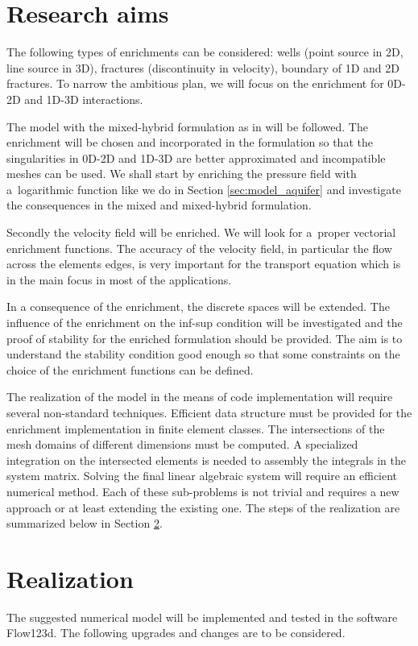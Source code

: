 \documentclass[dvipsnames,FM,Dis]{tulthesis}
\begin{document}
\section{Research aims}

The following types of enrichments can be considered: wells (point source in 2D, line source in 3D), 
fractures (discontinuity in velocity), boundary of 1D and 2D fractures. 
To narrow the ambitious plan, we will focus on the enrichment for 0D-2D and 1D-3D interactions.

The model with the mixed-hybrid formulation as in \cite{brezina_mixed-hybrid_2010, sistek_bddc_2015} will be followed.
The enrichment will be chosen and incorporated in the formulation so that the singularities in 0D-2D and
1D-3D are better approximated and incompatible meshes can be used. 
We shall start by enriching the pressure field with a~logarithmic function like we
do in Section \ref{sec:model_aquifer} and investigate the consequences in the mixed and mixed-hybrid formulation.

Secondly the velocity field will be enriched. We will look for a~proper vectorial enrichment functions.
The accuracy of the velocity field, in particular the flow across the elements edges, is very important for
the transport equation which is in the main focus in most of the applications.

In a consequence of the enrichment, the discrete spaces will be extended. The influence of the enrichment on the inf-sup 
condition will be investigated and the proof of stability for the enriched formulation should be provided.
The aim is to understand the stability condition good enough so that some constraints on the choice of the enrichment 
functions can be defined. 

The realization of the model in the means of code implementation will require several non-standard techniques.
Efficient data structure must be provided for the enrichment implementation in finite element classes.
The intersections of the mesh domains of different dimensions must be computed. A specialized integration
on the intersected elements is needed to assembly the integrals in the system matrix. 
Solving the final linear algebraic system will require an efficient numerical method.
Each of these sub-problems is not trivial and requires a new approach or at least extending the existing one.
The steps of the realization are summarized below in Section \ref{sec:realization}.

\section{Realization} \label{sec:realization}
The suggested numerical model will be implemented and tested in the software Flow123d.
The following upgrades and changes are to be considered.
\end{document}
